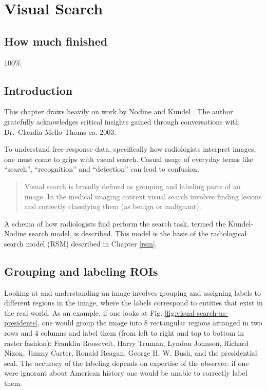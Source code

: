 \documentclass[
]{book}
\begin{document}
\hypertarget{visual-search}{%
\chapter{Visual Search}\label{visual-search}}

\hypertarget{visual-search-how-much-finished}{%
\section{How much finished}\label{visual-search-how-much-finished}}

100\%

\hypertarget{visual-search-intro}{%
\section{Introduction}\label{visual-search-intro}}

This chapter draws heavily on work by Nodine and Kundel \citep{nodine1987using, kundel2007holistic, kundel2004modeling, kundel1983visual, kundel1978visual}. The author gratefully acknowledges critical insights gained through conversations with Dr.~Claudia Mello-Thoms ca. 2003.

To understand free-response data, specifically how radiologists interpret images, one must come to grips with visual search. Casual usage of everyday terms like ``search'', ``recognition'' and ``detection'' can lead to confusion.

\begin{quote}
Visual search is broadly defined as grouping and labeling parts of an image. In the medical imaging context visual search involves finding lesions and correctly classifying them (as benign or malignant).
\end{quote}

A schema of how radiologists find perform the search task, termed the Kundel-Nodine search model, is described. This model is the basis of the radiological search model (RSM) described in Chapter \ref{rsm}.

\hypertarget{visual-search-grouping-labeling-rois}{%
\section{Grouping and labeling ROIs}\label{visual-search-grouping-labeling-rois}}

Looking at and understanding an image involves grouping and assigning labels to different regions in the image, where the labels correspond to entities that exist in the real world. As an example, if one looks at Fig. \ref{fig:visual-search-us-presidents}, one would group the image into 8 rectangular regions arranged in two rows and 4 columns and label them (from left to right and top to bottom in raster fashion): Franklin Roosevelt, Harry Truman, Lyndon Johnson, Richard Nixon, Jimmy Carter, Ronald Reagan, George H. W. Bush, and the presidential seal. The accuracy of the labeling depends on expertise of the observer: if one were ignorant about American history one would be unable to correctly label them.
\end{document}
